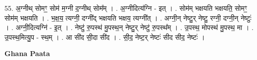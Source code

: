 \documentclass[17pt]{extarticle}
\begin{document}
55. अ॒ग्नीथ् सोमꣳ॒॒ सोम॑ म॒ग्नी द॒ग्नीथ् सोम᳚म् । . अ॒ग्नीदित्य॑ग्नि - इत् । . सोम॑म् भक्षयति भक्षयति॒ सोमꣳ॒॒ सोम॑म् भक्षयति । . भ॒क्ष॒य॒ त्यग्नी॒ दग्नी᳚द् भक्षयति भक्षय॒ त्यग्नी᳚त् । . अग्नी॒न् नेष्टु॒र् नेष्टु॒ रग्नी॒ दग्नी॒न् नेष्टुः॑ । . अग्नी॒दित्यग्नि॑ - इ॒त् । . नेष्टु॑ रु॒पस्थ॑ मु॒पस्थ॒न् नेष्टु॒र् नेष्टु॑ रु॒पस्थ᳚म् । . उ॒पस्थ॒ मोपस्थ॑ मु॒पस्थ॒ मा । . उ॒पस्थ॒मित्यु॒प - स्थ॒म् । . आ सी॑द सी॒दा सी॑द । . सी॒द॒ नेष्ट॒र् नेष्टः॑ सीद सीद॒ नेष्टः॑ । \newline

\textbf{Ghana Paata } \newline
\end{document}
